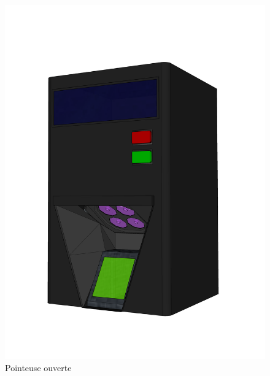 \begin{figure}[!htb]
    \vspace{-40pt}
    \begin{minipage}{0.5\textwidth}
        \centering
        \includegraphics[scale=0.16]{images/prototype/3.png}
        \vspace{-40pt}
        \caption{Pointeuse ouverte}\label{ }
    \end{minipage}\hfill
    \begin{minipage}{0.5\textwidth}
        \centering

\end{minipage}
\end{figure}
